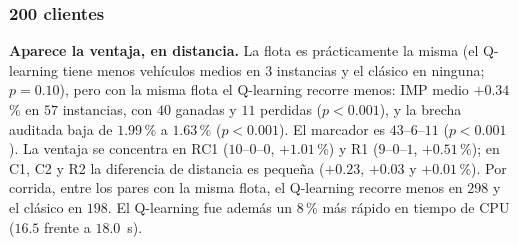 \subsubsection{200 clientes}
\label{sec:exp-200}

\begin{table}[H]
\centering
\caption{Gehring y Homberger, $200$ clientes: resultados por clase.}
\label{tab:res-200}
\end{table}

\textbf{Aparece la ventaja, en distancia.} La flota es prácticamente la misma (el Q-learning
tiene menos vehículos medios en $3$ instancias y el clásico en ninguna; $p=0.10$), pero con la
misma flota el Q-learning recorre menos: IMP medio $+0.34$\,\% en $57$ instancias, con $40$
ganadas y $11$ perdidas ($p<0.001$), y la brecha auditada baja de $1.99$\,\% a $1.63$\,\%
($p<0.001$). El marcador es $43$--$6$--$11$ ($p<0.001$). La ventaja se concentra en RC1
($10$--$0$--$0$, $+1.01$\,\%) y R1 ($9$--$0$--$1$, $+0.51$\,\%); en C1, C2 y R2 la diferencia de
distancia es pequeña ($+0.23$, $+0.03$ y $+0.01$\,\%). Por corrida, entre los pares con la
misma flota, el Q-learning recorre menos en $298$ y el clásico en $198$. El Q-learning fue
además un $8$\,\% más rápido en tiempo de CPU ($16.5$ frente a $18.0$~s).

